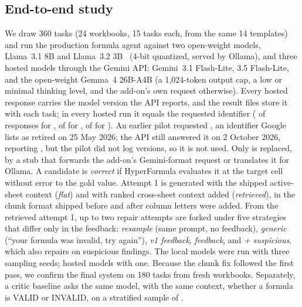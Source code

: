 \subsection{End-to-end study}
\label{sec:e5method}
We draw 360 tasks (24 workbooks, 15 tasks each, from the same 14 templates) and run the production formula agent against two open-weight models, Llama~3.1 8B and Llama~3.2 3B~\cite{dubey2024llama3} (4-bit quantized, served by Ollama), and three hosted models through the Gemini API: Gemini~3.1 Flash-Lite, 3.5 Flash-Lite, and the open-weight Gemma~4 26B-A4B (a 1{,}024-token output cap, a low or minimal thinking level, and the add-on's own request otherwise). Every hosted response carries the model version the API reports, and the result files store it with each task; in every hosted run it equals the requested identifier (\efDVersionMatch{} of \efDVersionCalls{} responses for \efDName, \efEVersionMatch{} of \efEVersionCalls{} for \efEName, \efFVersionMatch{} of \efFVersionCalls{} for \efFName). An earlier pilot requested , an identifier Google lists as retired on 25 May 2026; the API still answered it on 2 October 2026, reporting , but the pilot did not log versions, so it is not used. Only  is replaced, by a stub that forwards the add-on's Gemini-format request or translates it for Ollama. A candidate is \emph{correct} if HyperFormula evaluates it at the target cell without error to the gold value. Attempt 1 is generated with the shipped active-sheet context (\emph{flat}) and with ranked cross-sheet context added (\emph{retrieved}), in the chunk format shipped before and after column letters were added. From the retrieved attempt 1, up to two repair attempts are forked under five strategies that differ only in the feedback: \emph{resample} (same prompt, no feedback), \emph{generic} (``your formula was invalid, try again''), \emph{v1 feedback}, \emph{\gc{} feedback}, and \emph{\gc{} + suspicious}, which also repairs on suspicious findings. The local models were run with three sampling seeds; hosted models with one. Because the chunk fix followed the first pass, we confirm the final system on 180 tasks from fresh workbooks. Separately, a critic baseline asks the same model, with the same context, whether a formula is VALID or INVALID, on a stratified sample of \sheetfault.

